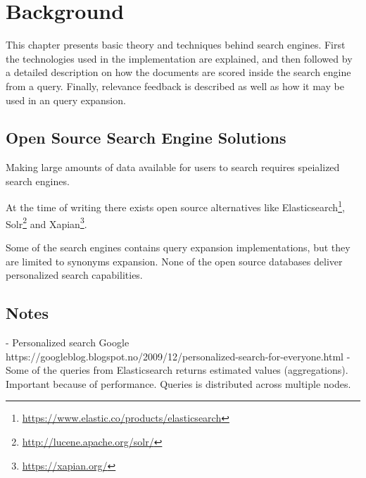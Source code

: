 \chapter{Background}
\label{ch:background}
This chapter presents basic theory and techniques behind search engines. First
the technologies used in the implementation are explained, and then followed by a
detailed description on how the documents are scored inside the search engine from a
query. Finally, relevance feedback is described as well as how it may be used in an query
expansion.

\section{Open Source Search Engine Solutions}
Making large amounts of data available for users to search requires speialized search engines.

At the time of writing there exists open source alternatives like Elasticsearch\footnote{\url{https://www.elastic.co/products/elasticsearch}},
Solr\footnote{\url{http://lucene.apache.org/solr/}} and Xapian\footnote{\url{https://xapian.org/}}.

Some of the search engines contains query expansion implementations,
but they are limited to synonyms expansion.
None of the open source databases deliver personalized search capabilities.







\section{Notes}
- Personalized search Google https://googleblog.blogspot.no/2009/12/personalized-search-for-everyone.html
- Some of the queries from Elasticsearch returns estimated values (aggregations). Important because of performance. Queries is distributed across multiple nodes.
